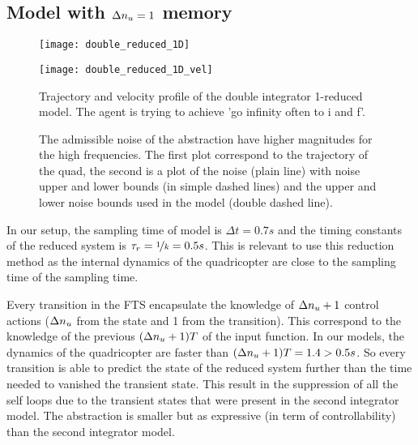 \subsection{Model with $\Delta n_u= 1$ memory}
\begin{figure}[!ht]
	\begin{minipage}[b]{0.5\textwidth}
  		\centering
  		\texttt{[image: double\_reduced\_1D]}
	  	\label{double_reduced_1D}
  \end{minipage}
	\begin{minipage}[b]{0.5\textwidth}
  		\centering
  		\texttt{[image: double\_reduced\_1D\_vel]}
	  	\label{double_reduced_1D_vel}
  \end{minipage}
  \caption{Trajectory and velocity profile of the double integrator 1-reduced model. The agent is trying to achieve 'go infinity often to i and f'.}
\end{figure}

\begin{figure}[!ht]
  	\centering
	
  	\label{double_reduced_1D_noise}
  	\caption{The admissible noise of the abstraction have higher magnitudes for the high frequencies. The first plot correspond to the trajectory of the quad, the second is a plot of the noise (plain line) with noise upper and lower bounds (in simple dashed lines) and the upper and lower noise bounds used in the model (double dashed line).}
\end{figure}

In our setup, the sampling time of model is ${\Delta t = 0.7s}$ and the timing constants of the reduced system is $\tau_r = {\nicefrac{1}{k} = 0.5s}$. This is relevant to use this reduction method as the internal dynamics of the quadricopter are close to the sampling time of the sampling time.

Every transition in the FTS encapsulate the knowledge of $\Delta n_u +1$ control actions ($\Delta n_u$ from the state and 1 from the transition). This correspond to the knowledge of the previous $(\Delta n_u +1)T$ of the input function. 
In our models, the dynamics of the quadricopter are faster than $(\Delta n_u +1)T = 1.4>0.5s$.
So every transition is able to predict the state of the reduced system further than the time needed to vanished the transient state.
This result in the suppression of all the self loops due to the transient states that were present in the second integrator model.
The abstraction is smaller but as expressive (in term of controllability) than the second integrator model.

